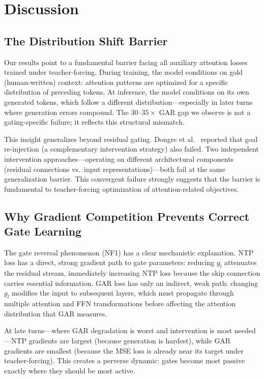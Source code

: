 \documentclass[11pt,a4paper]{article}
\newcommand{\gar}{\textsc{GAR}}
\begin{document}
\section{Discussion}
\label{sec:discussion}

\subsection{The Distribution Shift Barrier}

Our results point to a fundamental barrier facing all auxiliary attention losses trained under teacher-forcing.
During training, the model conditions on gold (human-written) context: attention patterns are optimized for a specific distribution of preceding tokens.
At inference, the model conditions on its own generated tokens, which follow a different distribution---especially in later turns where generation errors compound.
The $30$--$35\times$ \gar{} gap we observe is not a gating-specific failure; it reflects this structural mismatch.

This insight generalizes beyond residual gating.
Dongre et al.~\cite{dongre2026} reported that goal re-injection (a complementary intervention strategy) also failed.
Two independent intervention approaches---operating on different architectural components (residual connections vs.\ input representations)---both fail at the same generalization barrier.
This convergent failure strongly suggests that the barrier is fundamental to teacher-forcing optimization of attention-related objectives.

\subsection{Why Gradient Competition Prevents Correct Gate Learning}

The gate reversal phenomenon (NF1) has a clear mechanistic explanation.
NTP loss has a direct, strong gradient path to gate parameters: reducing $g_l$ attenuates the residual stream, immediately increasing NTP loss because the skip connection carries essential information.
\gar{} loss has only an indirect, weak path: changing $g_l$ modifies the input to subsequent layers, which must propagate through multiple attention and FFN transformations before affecting the attention distribution that \gar{} measures.

At late turns---where \gar{} degradation is worst and intervention is most needed---NTP gradients are largest (because generation is hardest), while \gar{} gradients are smallest (because the MSE loss is already near its target under teacher-forcing).
This creates a perverse dynamic: gates become most passive exactly where they should be most active.
\end{document}
